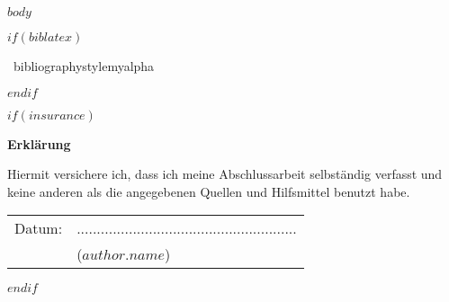 \documentclass[12pt,a4paper,bibliography=totocnumbered,listof=totocnumbered]{scrartcl}
\begin{document}
\renewcommand{\sectionmark}[1]{\markright{#1}}
\renewcommand{\subsectionmark}[1]{}
\renewcommand{\subsubsectionmark}[1]{}
\rhead{} %

\onehalfspacing
\renewcommand{\thesection}{\arabic{section}}
\renewcommand{\theHsection}{\arabic{section}}
\setcounter{section}{0}
\setcounter{page}{1}

$body$


$if(biblatex)$
	\pagebreak
	\lhead{}
	\renewcommand{\refname}{Quellenverzeichnis}	

	\ bibliographystyle{myalpha}
	
	\pagebreak

$endif$

$if(insurance)$
	\newpage
	\thispagestyle{empty}
	\begin{center}
		\vspace*{5em}
		\huge\textbf{Erklärung}\\
	\end{center}
	\vspace{2em}
	Hiermit versichere ich, dass ich meine Abschlussarbeit selbständig verfasst und keine anderen als die angegebenen Quellen und Hilfsmittel benutzt habe.

	\vspace{4em}
	\begin{minipage}{\linewidth}
		\begin{tabular}{p{15em}p{15em}}
			Datum: &  .......................................................\\
			& \centering ($author.name$)\\
		\end{tabular}
	\end{minipage}
$endif$
\end{document}
